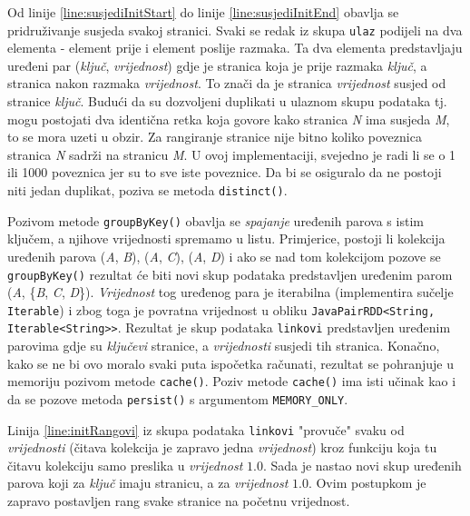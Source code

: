 \documentclass[times, utf8, zavrsni, numeric]{fer}
\begin{document}
Od linije \ref{line:susjediInitStart} do linije \ref{line:susjediInitEnd} obavlja se pridruživanje susjeda svakoj stranici. Svaki se redak iz skupa \texttt{ulaz} podijeli na dva elementa - element prije i element poslije razmaka. Ta dva elementa predstavljaju uređeni par (\emph{ključ}, \emph{vrijednost}) gdje je stranica koja je prije razmaka \emph{ključ}, a stranica nakon razmaka \emph{vrijednost}. To znači da je stranica \emph{vrijednost} susjed od stranice \emph{ključ}. Budući da su dozvoljeni duplikati u ulaznom skupu podataka tj. mogu postojati dva identična retka koja govore kako stranica \emph{N} ima susjeda \emph{M}, to se mora uzeti u obzir. Za rangiranje stranice nije bitno koliko poveznica stranica \emph{N} sadrži na stranicu \emph{M}. U ovoj implementaciji, svejedno je radi li se o 1 ili 1000 poveznica jer su to sve iste poveznice. Da bi se osiguralo da ne postoji niti jedan duplikat, poziva se metoda \texttt{distinct()}.

Pozivom metode \texttt{groupByKey()} obavlja se \emph{spajanje} uređenih parova s istim ključem, a njihove vrijednosti spremamo u listu. Primjerice, postoji li kolekcija uređenih parova (\emph{A}, \emph{B}), (\emph{A}, \emph{C}), (\emph{A}, \emph{D}) i ako se nad tom kolekcijom pozove se \texttt{groupByKey()} rezultat će biti novi skup podataka predstavljen uređenim parom (\emph{A}, \{\emph{B}, \emph{C}, \emph{D}\}). \emph{Vrijednost} tog uređenog para je iterabilna (implementira sučelje \texttt{Iterable}) i zbog toga je povratna vrijednost u obliku \texttt{JavaPairRDD<String, Iterable<String>{}>}. Rezultat je skup podataka \texttt{linkovi} predstavljen uređenim parovima gdje su \emph{ključevi} stranice, a \emph{vrijednosti} susjedi tih stranica. Konačno, kako se ne bi ovo moralo svaki puta ispočetka računati, rezultat se pohranjuje u memoriju pozivom metode \texttt{cache()}. Poziv metode \texttt{cache()} ima isti učinak kao i da se pozove metoda \texttt{persist()} s argumentom \texttt{MEMORY\_ONLY}.

Linija \ref{line:initRangovi} iz skupa podataka \texttt{linkovi} "provuče" svaku od \emph{vrijednosti} (čitava kolekcija je zapravo jedna \emph{vrijednost}) kroz funkciju koja tu čitavu kolekciju samo preslika u \emph{vrijednost} $1.0$. Sada je nastao novi skup uređenih parova koji za \emph{ključ} imaju stranicu, a za \emph{vrijednost} $1.0$. Ovim postupkom je zapravo postavljen rang svake stranice na početnu vrijednost.
\end{document}
